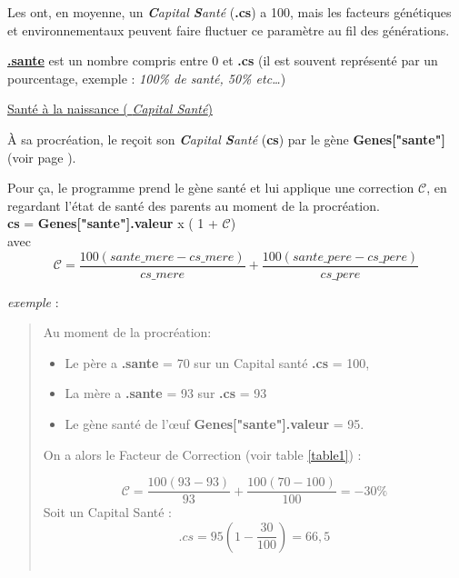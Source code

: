 \documentclass[french]{report}
\begin{document}
Les \CoCiX ont, en moyenne, un \textit{\textbf{C}apital \textbf{S}anté} (\textbf{.cs})  a 100, mais les facteurs génétiques et environnementaux peuvent faire fluctuer ce paramètre au fil des générations.

\textbf{\underline{.sante}} est un nombre compris entre 0 et \textbf{.cs} (il est souvent représenté par un pourcentage, exemple : \textit{100\% de santé, 50\% etc\dots})
\begin{center}
	
\underline{Santé à la naissance ( \textit{Capital Santé})}\label{sante_naissance}

\end{center}
À sa procréation, le \CoCiX reçoit son \textit{\textbf{C}apital \textbf{S}anté} (\textbf{cs}) par le gène \textbf{Genes["sante"]} (voir page \pageref{liste_gene}).

Pour ça, le programme prend le gène santé et lui applique une correction \textbf{$\mathcal{C}$}, en regardant l'état de santé des parents au moment de la procréation.\\


\textbf{cs} = \textbf{Genes["sante"].valeur} x ( 1  + $\mathcal{C}$) \\

avec \[ \mathcal{C} = \frac{100(sante\_mere - cs\_mere)}{cs\_mere} + \frac{100(sante\_pere - cs\_pere)}{cs\_pere}\]

\textit{exemple} : \\
\begin{quote}
Au moment de la procréation:
\begin{itemize}
\item Le père a \textbf{.sante} =  70 sur un Capital santé \textbf{.cs} = 100,
\item La mère a \textbf{.sante} = 93 sur \textbf{.cs} = 93 
\item Le gène santé de l'œuf \textbf{Genes["sante"].valeur} = 95.\\
\end{itemize}

On a alors le Facteur de Correction (voir table \ref{table1}) :

 \[ \mathcal{C} = \frac{100(93 - 93)}{93} + \frac{100(70 - 100)}{100} = - 30 \% \]
Soit un Capital Santé : \\
\[ .cs = 95 ( 1 - \frac{30}{100}) = 66,5\]\\
\end{quote}
\end{document}
